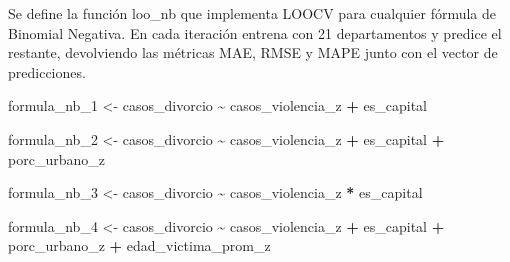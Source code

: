 \documentclass[
]{article}
\newenvironment{Shaded}{\begin{snugshade}}{\end{snugshade}}
\newcommand{\AttributeTok}[1]{\textcolor[rgb]{0.13,0.29,0.53}{#1}}
\newcommand{\ConstantTok}[1]{\textcolor[rgb]{0.56,0.35,0.01}{#1}}
\newcommand{\ControlFlowTok}[1]{\textcolor[rgb]{0.13,0.29,0.53}{\textbf{#1}}}
\newcommand{\FunctionTok}[1]{\textcolor[rgb]{0.13,0.29,0.53}{\textbf{#1}}}
\newcommand{\NormalTok}[1]{#1}
\newcommand{\OtherTok}[1]{\textcolor[rgb]{0.56,0.35,0.01}{#1}}
\newcommand{\SpecialCharTok}[1]{\textcolor[rgb]{0.81,0.36,0.00}{\textbf{#1}}}
\newcommand{\StringTok}[1]{\textcolor[rgb]{0.31,0.60,0.02}{#1}}
\begin{document}
\begin{Shaded}
\end{Shaded}

Se define la función loo\_nb que implementa LOOCV para cualquier fórmula
de Binomial Negativa. En cada iteración entrena con 21 departamentos y
predice el restante, devolviendo las métricas MAE, RMSE y MAPE junto con
el vector de predicciones.

\begin{Shaded}
\begin{Highlighting}[]
\NormalTok{formula\_nb\_1 }\OtherTok{\textless{}{-}}\NormalTok{ casos\_divorcio }\SpecialCharTok{\textasciitilde{}}\NormalTok{ casos\_violencia\_z }\SpecialCharTok{+}\NormalTok{ es\_capital}

\NormalTok{formula\_nb\_2 }\OtherTok{\textless{}{-}}\NormalTok{ casos\_divorcio }\SpecialCharTok{\textasciitilde{}}\NormalTok{ casos\_violencia\_z }\SpecialCharTok{+}\NormalTok{ es\_capital }\SpecialCharTok{+}
\NormalTok{                porc\_urbano\_z}

\NormalTok{formula\_nb\_3 }\OtherTok{\textless{}{-}}\NormalTok{ casos\_divorcio }\SpecialCharTok{\textasciitilde{}}\NormalTok{ casos\_violencia\_z }\SpecialCharTok{*}\NormalTok{ es\_capital}

\NormalTok{formula\_nb\_4 }\OtherTok{\textless{}{-}}\NormalTok{ casos\_divorcio }\SpecialCharTok{\textasciitilde{}}\NormalTok{ casos\_violencia\_z }\SpecialCharTok{+}\NormalTok{ es\_capital }\SpecialCharTok{+}
\NormalTok{                porc\_urbano\_z }\SpecialCharTok{+}\NormalTok{ edad\_victima\_prom\_z}
\end{Highlighting}
\end{Shaded}
\end{document}
